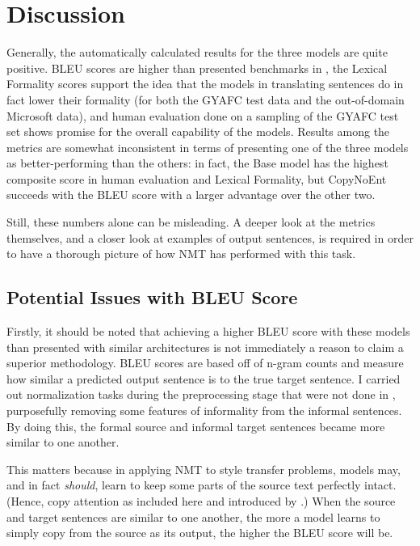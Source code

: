 \section{Discussion}

Generally, the automatically calculated results for the three models are quite positive. BLEU scores are higher than presented benchmarks in \cite{rao2018gyafc}, the Lexical Formality scores support the idea that the models in translating sentences do in fact lower their formality (for both the GYAFC test data and the out-of-domain Microsoft data), and human evaluation done on a sampling of the GYAFC test set shows promise for the overall capability of the models. Results among the metrics are somewhat inconsistent in terms of presenting one of the three models as better-performing than the others: in fact, the Base model has the highest composite score in human evaluation and Lexical Formality, but CopyNoEnt succeeds with the BLEU score with a larger advantage over the other two.

Still, these numbers alone can be misleading. A deeper look at the metrics themselves, and a closer look at examples of output sentences, is required in order to have a thorough picture of how NMT has performed with this task.

\subsection{Potential Issues with BLEU Score}

Firstly, it should be noted that achieving a higher BLEU score with these models than \cite{rao2018gyafc} presented with similar architectures is not immediately a reason to claim a superior methodology. BLEU scores are based off of n-gram counts and measure how similar a predicted output sentence is to the true target sentence. I carried out normalization tasks during the preprocessing stage that were not done in \cite{rao2018gyafc}, purposefully removing some features of informality from the informal sentences. By doing this, the formal source and informal target sentences became more similar to one another. 

This matters because in applying NMT to style transfer problems, models may, and in fact \textit{should}, learn to keep some parts of the source text perfectly intact. (Hence, copy attention as included here and introduced by \cite{jhamtani2017copy}.) When the source and target sentences are similar to one another, the more a model learns to simply copy from the source as its output, the higher the BLEU score will be.

